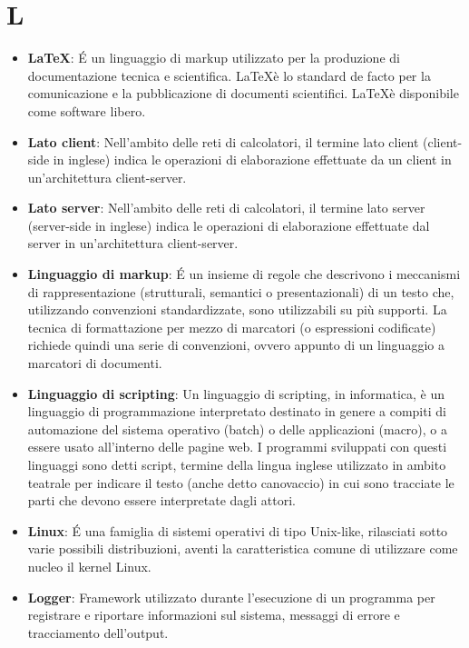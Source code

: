 \section{L}
\begin{itemize} 
	\item
	\textbf{\LaTeX}: É un linguaggio di markup utilizzato per la produzione di documentazione tecnica e scientifica. \LaTeX è lo standard de facto per la comunicazione e la pubblicazione di documenti scientifici. \LaTeX è disponibile come software libero.
	\item
	\textbf{Lato client}: Nell'ambito delle reti di calcolatori, il termine lato client (client-side in inglese) indica le operazioni di elaborazione effettuate da un client in un'architettura client-server.
	\item
	\textbf{Lato server}: Nell'ambito delle reti di calcolatori, il termine lato server (server-side in inglese) indica le operazioni di elaborazione effettuate dal server in un'architettura client-server.
	\item
	\textbf{Linguaggio di markup}: É un insieme di regole che descrivono i meccanismi di rappresentazione (strutturali, semantici o presentazionali) di un testo che, utilizzando convenzioni standardizzate, sono utilizzabili su più supporti. La tecnica di formattazione per mezzo di marcatori (o espressioni codificate) richiede quindi una serie di convenzioni, ovvero appunto di un linguaggio a marcatori di documenti.
	\item
	\textbf{Linguaggio di scripting}: Un linguaggio di scripting, in informatica, è un linguaggio di programmazione interpretato destinato in genere a compiti di automazione del sistema operativo (batch) o delle applicazioni (macro), o a essere usato all'interno delle pagine web.
	I programmi sviluppati con questi linguaggi sono detti script, termine della lingua inglese utilizzato in ambito teatrale per indicare il testo (anche detto canovaccio) in cui sono tracciate le parti che devono essere interpretate dagli attori.
	\item
	\textbf{Linux}: É una famiglia di sistemi operativi di tipo Unix-like, rilasciati sotto varie possibili distribuzioni, aventi la caratteristica comune di utilizzare come nucleo il kernel Linux.
	\item
	\textbf{Logger}: Framework utilizzato durante l'esecuzione di un programma per registrare e riportare informazioni sul sistema, messaggi di errore e tracciamento dell'output.
\end{itemize}